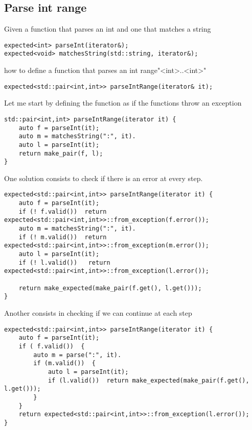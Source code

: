 \documentclass[a4paper,10pt]{article}
\begin{document}
\subsection{Parse int range}

Given a function that parses an int and one that matches a string

\begin{lstlisting}
expected<int> parseInt(iterator&);
expected<void> matchesString(std::string, iterator&);
\end{lstlisting}

how to define a function that parses an int range"<int>..<int>"

\begin{lstlisting}
expected<std::pair<int,int>> parseIntRange(iterator& it);
\end{lstlisting}


Let me start by defining the function as if the functions throw an exception

\begin{lstlisting}
std::pair<int,int> parseIntRange(iterator it) {
    auto f = parseInt(it);
    auto m = matchesString(":", it).
    auto l = parseInt(it);       
    return make_pair(f, l);
}
\end{lstlisting}

One solution consists to check if there is an error at every step. 

\begin{lstlisting}
expected<std::pair<int,int>> parseIntRange(iterator it) {
    auto f = parseInt(it);
    if (! f.valid())  return expected<std::pair<int,int>>::from_exception(f.error());
    auto m = matchesString(":", it).
    if (! m.valid())  return expected<std::pair<int,int>>::from_exception(m.error());
    auto l = parseInt(it);
    if (! l.valid())   return expected<std::pair<int,int>>::from_exception(l.error());
        
    return make_expected(make_pair(f.get(), l.get()));
}
\end{lstlisting}

Another consists in checking if we can continue at each step

\begin{lstlisting}
expected<std::pair<int,int>> parseIntRange(iterator it) {
    auto f = parseInt(it);
    if ( f.valid())  {
        auto m = parse(":", it).
        if (m.valid())  {
            auto l = parseInt(it);
            if (l.valid())  return make_expected(make_pair(f.get(), l.get()));
        }
    }        
    return expected<std::pair<int,int>>::from_exception(l.error());
}
\end{lstlisting}
\end{document}
